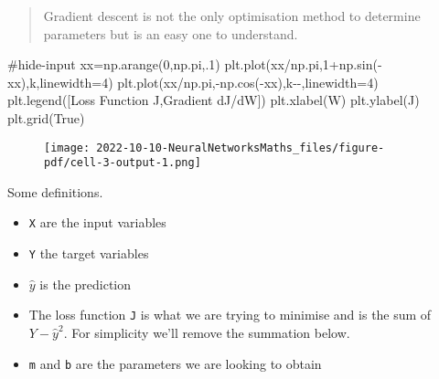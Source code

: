 \documentclass[
  letterpaper,
  DIV=11,
  numbers=noendperiod]{scrartcl}
\newenvironment{Shaded}{\begin{snugshade}}{\end{snugshade}}
\newcommand{\CommentTok}[1]{\textcolor[rgb]{0.37,0.37,0.37}{#1}}
\newcommand{\DecValTok}[1]{\textcolor[rgb]{0.68,0.00,0.00}{#1}}
\newcommand{\FloatTok}[1]{\textcolor[rgb]{0.68,0.00,0.00}{#1}}
\newcommand{\NormalTok}[1]{\textcolor[rgb]{0.00,0.23,0.31}{#1}}
\newcommand{\OperatorTok}[1]{\textcolor[rgb]{0.37,0.37,0.37}{#1}}
\newcommand{\StringTok}[1]{\textcolor[rgb]{0.13,0.47,0.30}{#1}}
\newcommand{\VariableTok}[1]{\textcolor[rgb]{0.07,0.07,0.07}{#1}}
\providecommand{\tightlist}{%
  \setlength{\itemsep}{0pt}\setlength{\parskip}{0pt}}\usepackage{longtable,booktabs,array}
\begin{document}
\begin{quote}
Gradient descent is not the only optimisation method to determine
parameters but is an easy one to understand.
\end{quote}

\begin{Shaded}
\begin{Highlighting}[]
\CommentTok{\#hide{-}input}
\NormalTok{xx}\OperatorTok{=}\NormalTok{np.arange(}\DecValTok{0}\NormalTok{,np.pi,}\FloatTok{.1}\NormalTok{)}
\NormalTok{plt.plot(xx}\OperatorTok{/}\NormalTok{np.pi,}\DecValTok{1}\OperatorTok{+}\NormalTok{np.sin(}\OperatorTok{{-}}\NormalTok{xx),}\StringTok{\textquotesingle{}{-}k\textquotesingle{}}\NormalTok{,linewidth}\OperatorTok{=}\DecValTok{4}\NormalTok{)}
\NormalTok{plt.plot(xx}\OperatorTok{/}\NormalTok{np.pi,}\OperatorTok{{-}}\NormalTok{np.cos(}\OperatorTok{{-}}\NormalTok{xx),}\StringTok{\textquotesingle{}k{-}{-}\textquotesingle{}}\NormalTok{,linewidth}\OperatorTok{=}\DecValTok{4}\NormalTok{)}
\NormalTok{plt.legend([}\StringTok{\textquotesingle{}Loss Function J\textquotesingle{}}\NormalTok{,}\StringTok{\textquotesingle{}Gradient dJ/dW\textquotesingle{}}\NormalTok{])}
\NormalTok{plt.xlabel(}\StringTok{\textquotesingle{}W\textquotesingle{}}\NormalTok{)}
\NormalTok{plt.ylabel(}\StringTok{\textquotesingle{}J\textquotesingle{}}\NormalTok{)}
\NormalTok{plt.grid(}\VariableTok{True}\NormalTok{)}
\end{Highlighting}
\end{Shaded}

\begin{figure}[H]

{\centering \texttt{[image: 2022-10-10-NeuralNetworksMaths\_files/figure-pdf/cell-3-output-1.png]}

}

\end{figure}

Some definitions.

\begin{itemize}
\tightlist
\item
  \texttt{X} are the input variables
\item
  \texttt{Y} the target variables
\item
  \(\hat{y}\) is the prediction
\item
  The loss function \texttt{J} is what we are trying to minimise and is
  the sum of \({Y-\hat{y}^2}\). For simplicity we'll remove the
  summation below.
\item
  \texttt{m} and \texttt{b} are the parameters we are looking to obtain
\end{itemize}
\end{document}
